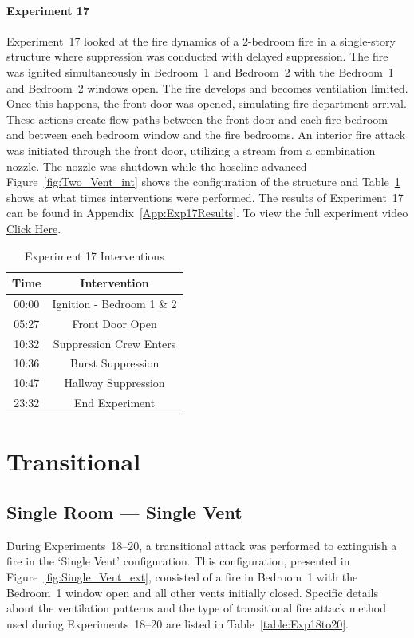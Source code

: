 \documentclass[12pt,oneside]{book}
\begin{document}
\paragraph{Experiment 17}
Experiment~17 looked at the fire dynamics of a 2-bedroom fire in a single-story structure where suppression was conducted with delayed suppression. The fire was ignited simultaneously in Bedroom~1 and Bedroom~2 with the Bedroom~1 and Bedroom~2 windows open. The fire develops and becomes ventilation limited. Once this happens, the front door was opened, simulating fire department arrival. These actions create flow paths between the front door and each fire bedroom and between each bedroom window and the fire bedrooms. An interior fire attack was initiated through the front door, utilizing a stream from a combination nozzle. The nozzle was shutdown while the hoseline advanced Figure~\ref{fig:Two_Vent_int} shows the configuration of the structure and Table~\ref{Table:Exp17Interventions} shows at what times interventions were performed. The results of Experiment~17 can be found in Appendix~\ref{App:Exp17Results}. To view the full experiment video \href{https://player.vimeo.com/video/170499615?autoplay=1}{Click Here}.

\begin{table}[H]
	\centering
	\caption{Experiment 17 Interventions}
	\begin{tabular}{|c|c|} 
		\hline
		Time & Intervention \\ \hline \hline
		00:00 & Ignition - Bedroom 1 \& 2 \\ \hline
		05:27 & Front Door Open \\ \hline
		10:32 & Suppression Crew Enters\\ \hline
		10:36 & Burst Suppression \\ \hline 
		10:47 & Hallway Suppression \\ \hline
		23:32 & End Experiment\\ \hline
	\end{tabular}
	\label{Table:Exp17Interventions}
\end{table}

\clearpage

\section{Transitional}

\subsection{Single Room --- Single Vent}
During Experiments~18--20, a transitional attack was performed to extinguish a fire in the `Single Vent' configuration. This configuration, presented in Figure~\ref{fig:Single_Vent_ext}, consisted of a fire in Bedroom~1 with the Bedroom~1 window open and all other vents initially closed. Specific details about the ventilation patterns and the type of transitional fire attack method used during Experiments~18--20 are listed in Table~\ref{table:Exp18to20}. 
\end{document}
